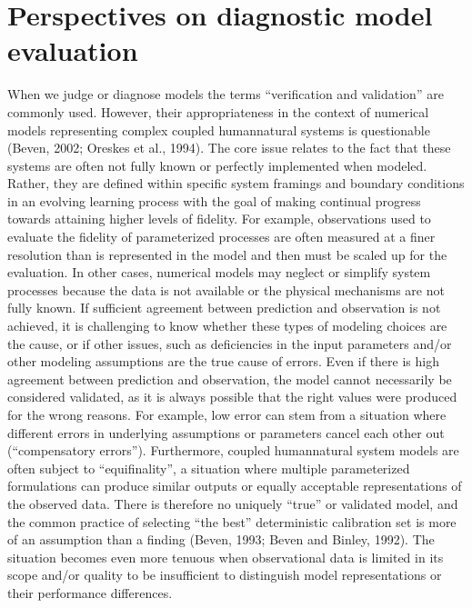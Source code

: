 \documentclass[letterpaper,10pt,english]{sphinxmanual}
\begin{document}
\section{Perspectives on diagnostic model evaluation}
\label{\detokenize{2_diagnostic_modeling_overview_and_perspectives:perspectives-on-diagnostic-model-evaluation}}
\sphinxAtStartPar
When we judge or diagnose models the terms “verification and validation” are commonly used. However, their appropriateness in the context of numerical models representing complex coupled human\sphinxhyphen{}natural systems is questionable (Beven, 2002; Oreskes et al., 1994). The core issue relates to the fact that these systems are often not fully known or perfectly implemented when modeled. Rather, they are defined within specific system framings and boundary conditions in an evolving learning process with the goal of making continual progress towards attaining higher levels of fidelity. For example, observations used to evaluate the fidelity of parameterized processes are often measured at a finer resolution than is represented in the model and then must be scaled up for the evaluation. In other cases, numerical models may neglect or simplify system processes because the data is not available or the physical mechanisms are not fully known. If sufficient agreement between prediction and observation is not achieved, it is challenging to know whether these types of modeling choices are the cause, or if other issues, such as deficiencies in the input parameters and/or other modeling assumptions are the true cause of errors. Even if there is high agreement between prediction and observation, the model cannot necessarily be considered validated, as it is always possible that the right values were produced for the wrong reasons. For example, low error can stem from a situation where different errors in underlying assumptions or parameters cancel each other out (“compensatory errors”). Furthermore, coupled human\sphinxhyphen{}natural system models are often subject to “equifinality”, a situation where multiple parameterized formulations can produce similar outputs or equally acceptable representations of the observed data. There is therefore no uniquely “true” or validated model, and the common practice of selecting “the best” deterministic calibration set is more of an assumption than a finding (Beven, 1993; Beven and Binley, 1992). The situation becomes even more tenuous when observational data is limited in its scope and/or quality to be insufficient to distinguish model representations or their performance differences.
\end{document}
